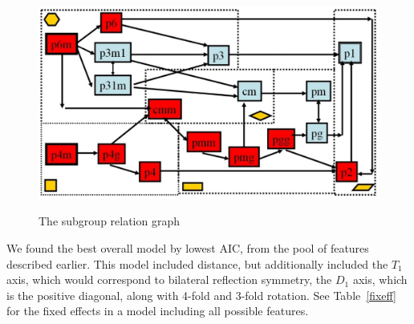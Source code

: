 \begin{figure}[!ht]
\centering
\includegraphics[width=0.9\columnwidth]{Yanxi_Graph}
\label{graph}
\caption{The subgroup relation graph}
\end{figure}

We found the best overall model by lowest AIC, from the pool of features described earlier. This model included distance, but additionally included the $T_1$ axis, which would correspond to bilateral reflection symmetry, the $D_1$ axis, which is the positive diagonal, along with 4-fold and 3-fold rotation. See Table~\ref{fixeff} for the fixed effects in a model including all possible features.